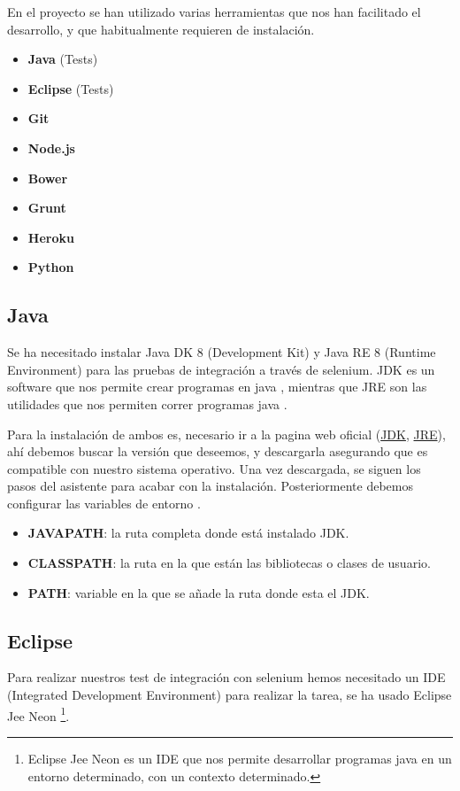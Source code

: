 En el proyecto se han utilizado varias herramientas que nos han facilitado el desarrollo, y que habitualmente requieren de instalación.

\begin{itemize}
	\item \textbf{Java} (Tests)
	\item \textbf{Eclipse} (Tests)
	\item \textbf{Git}
	\item \textbf{Node.js}
	\item \textbf{Bower}
	\item \textbf{Grunt}
	\item \textbf{Heroku}
	\item \textbf{Python}
\end{itemize}

\subsection{Java}

Se ha necesitado instalar Java DK 8 (Development Kit) y Java RE 8 (Runtime Environment) para las pruebas de integración a través de selenium. JDK es un software que nos permite crear programas en java \cite{jdkbib}, mientras que JRE son las utilidades que nos permiten correr programas java \cite{jrebib}.

Para la instalación de ambos es, necesario ir a la pagina web oficial (\href{http://www.oracle.com/technetwork/java/javase/downloads/jdk8-downloads-2133151.html}{JDK}, \href{http://www.oracle.com/technetwork/java/javase/downloads/jre8-downloads-2133155.html}{JRE}), ahí debemos buscar la versión que deseemos, y descargarla asegurando que es compatible con nuestro sistema operativo. Una vez descargada, se siguen los pasos del asistente para acabar con la instalación. Posteriormente debemos configurar las variables de entorno \cite{jdkbib}.

\begin{itemize}
	\item \textbf{JAVAPATH}: la ruta completa donde está instalado JDK.
	\item \textbf{CLASSPATH}: la ruta en la que están las bibliotecas o clases de usuario.
	\item \textbf{PATH}: variable en la que se añade la ruta donde esta el JDK.
\end{itemize}


\subsection{Eclipse}
 Para realizar nuestros test de integración con selenium hemos necesitado un IDE (Integrated Development Environment) para realizar la tarea, se ha usado Eclipse Jee Neon \footnote{Eclipse Jee Neon es un IDE que nos permite desarrollar programas java en un entorno determinado, con un contexto determinado.}.
 
